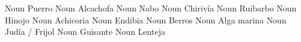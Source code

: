                  {}              {Noun}      {Puerro}                {}
            {}              {Noun}      {Alcachofa}             {}
               {}              {Noun}      {Nabo}                  {}
              {}              {Noun}      {Chirivía}              {}
              {}              {Noun}      {Ruibarbo}              {}
               {}              {Noun}      {Hinojo}                {}
              {}              {Noun}      {Achicoria}             {}
               {}              {Noun}      {Endibia}               {}
           {}              {Noun}      {Berros}                {}
              {}              {Noun}      {Alga marina}           {}
                 {}              {Noun}      {Judía / Frijol}        {}
                  {}              {Noun}      {Guisante}              {}
               {}              {Noun}      {Lenteja}               {}